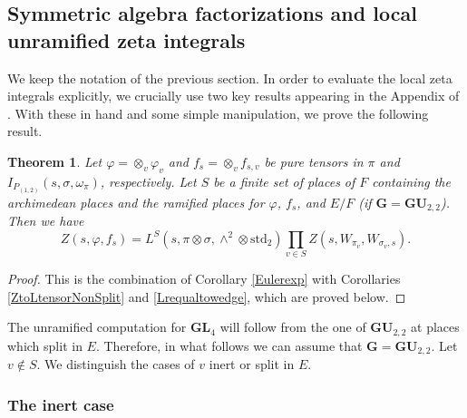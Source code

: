 \documentclass[11pt, reqno]{amsart}
\theoremstyle{plain}
\newtheorem{theorem}{Theorem}[section]
\theoremstyle{definition}
\theoremstyle{remark}
\theoremstyle{plain}
\def\G{\mathbf{G}}
\def\GU{{\mathbf{GU}}}
\def\GL{\mathbf{GL}}
\begin{document}
\subsection{Symmetric algebra factorizations and local unramified zeta integrals}\label{subsec_localzeta1}


We keep the notation of the previous section. In order to evaluate the local zeta integrals explicitly, we crucially use two key results appearing in the Appendix of \cite{ExplicitGSR}. With these in hand and some simple manipulation, we prove the following result.

\begin{theorem}\label{zetaintegralfinalthm}
    Let $\varphi = \otimes_v\varphi_v$ and $f_{s} = \otimes_v f_{s,v}$ be pure tensors in $\pi$ and $I_{P_{(1,2)}}(s,\sigma, \omega_\pi)$, respectively. Let $S$ be a finite set of places of $F$ containing the archimedean places and the ramified places for $\varphi$, $f_s$, and $E/F$ (if $\G = \GU_{2,2}$). Then we have
    \[Z(s,\varphi,f_s) = L^S(s,\pi \otimes \sigma, \wedge^2 \otimes  \mathrm{std}_2)\prod_{v\in S}Z(s,W_{\pi_v},W_{\sigma_v,s}).\]
\end{theorem}

\begin{proof}
  This is the combination of Corollary \ref{Eulerexp} with Corollaries \ref{ZtoLtensorNonSplit} and \ref{Lrequaltowedge}, which are proved below. 
\end{proof}

\noindent The unramified computation for $\GL_4$ will follow from the one of $\GU_{2,2}$ at places which split in $E$. Therefore, in what follows we can assume that $\G = \GU_{2,2}$. Let $v \not \in S$. We distinguish the cases of $v$ inert or split in $E$.

\subsubsection{The inert case}
\end{document}
